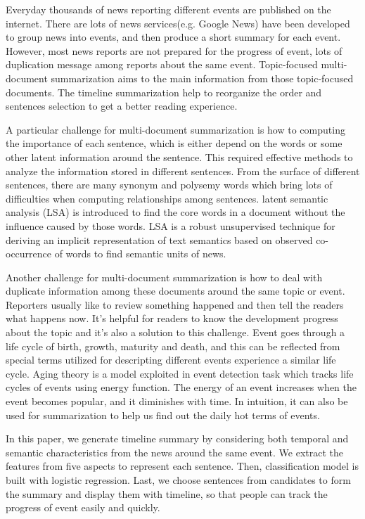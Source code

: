 \documentclass{acm_proc_article-sp}
\begin{document}
Everyday thousands of news reporting different events are published on the internet. 
There are lots of news services(e.g. Google News) have been developed to group news into events, and then produce a short summary for each event.
However, most news reports are not prepared for the progress of event, lots of duplication message among reports about the same event. 
Topic-focused multi-document summarization aims to the main information from those topic-focused documents. 
The timeline summarization help to reorganize the order and sentences selection to get a better reading experience.

A particular challenge for multi-document summarization is how to computing the importance of each sentence, which is either depend on the words or some other latent information around the sentence.
This required effective methods to analyze the information stored in different sentences.
From the surface of different sentences, there are many synonym and polysemy words which bring lots of difficulties when computing relationships among sentences.
latent semantic analysis (LSA) \cite{1990-Deerwester-p391-407} is introduced to find the core words in a document without the influence caused by those words.
LSA is a robust unsupervised technique for deriving an implicit representation of text semantics based on observed co-occurrence of words to find semantic units of news.


Another challenge for multi-document summarization is how to deal with duplicate information among these documents around the same topic or event.
Reporters usually like to review something happened and then tell the readers what happens now. 
It's helpful for readers to know the development progress about the topic and it's also a solution to this challenge.
Event goes through a life cycle of birth, growth, maturity and death, and this can be reflected from special terms utilized for descripting different events experience a similar life cycle. 
Aging theory \cite{chen2003life} is a model exploited in event detection task which tracks life cycles of events using energy function. 
The energy of an event increases when the event becomes popular, and it diminishes with time. 
In intuition, it can also be used for summarization to help us find out the daily hot terms of events. 


In this paper, we generate timeline summary by considering both temporal and semantic characteristics from the news around the same event. 
We extract the features from five aspects to represent each sentence. 
Then, classification model is built with logistic regression. 
Last, we choose sentences from candidates to form the summary and display them with timeline, so that people can track the progress of event easily and quickly.
\end{document}
